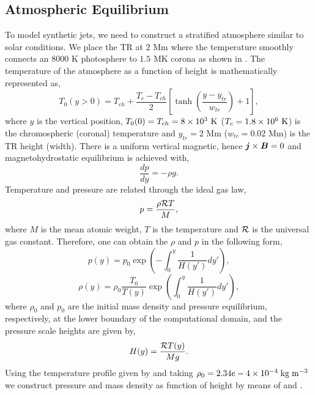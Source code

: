 \subsection{Atmospheric Equilibrium}
\label{sec:atmos_equil}
To model synthetic jets, we need to construct a stratified atmosphere similar to solar conditions. We place the TR at $2$ Mm where the temperature smoothly connects an $8000$ K photosphere to $1.5$ MK corona as shown in . The temperature of the atmosphere as a function of height is mathematically represented as,   
\begin{equation}\label{te_pro}
T_0(y>0) = T_{ch}+\frac{T_{c} - T_{ch}}{2} \left[ \tanh \left( \frac{y-y_{tr}}{w_{tr}} \right)+1 \right],
\end{equation}
where $y$ is the vertical position, $T_0(0)=T_{ch}=8\times10^3 \ \rm{K}$ ($T_{c}=1.8\times10^6 \ \rm{K}$) is the chromospheric (coronal) temperature and $y_{tr}=2$ Mm ($w_{tr}=0.02$ Mm) is the TR height (width). There is a uniform vertical magnetic, hence $\boldsymbol{j} \times \boldsymbol{B}=0$ and magnetohydrostatic equilibrium is achieved with,
\begin{equation}
\frac{dp}{dy} = - \rho g.
\end{equation}
Temperature and pressure are related through the ideal gas law,
\begin{equation}
p = \frac{ \rho \mathcal{R} T}{M},
\end{equation} 
where $M$ is the mean atomic weight, $T$ is the temperature and $\mathcal{R}$ is the universal gas constant. Therefore, one can obtain the $\rho$ and $p$ in the following form,  
\begin{equation}\label{p_pro}
p(y) = p_0 \exp \left( - \int_0^y  \frac{1}{H(y')} dy' \right), 
\end{equation} 
\begin{equation}\label{rho_pro}
\rho(y) = \rho_0 \frac{T_0}{T(y)} \exp \left( \int_0^y \frac{1}{H(y') }dy' \right),
\end{equation}
where $\rho_0$ and $p_0$ are the initial mass density and pressure equilibrium, respectively, at the lower boundary of the computational domain, and the pressure scale heights are given by,
\begin{equation}
H(y) = \frac{\mathcal{R} T(y)}{Mg}.
\end{equation}
Using the temperature profile given by  and taking $\rho_0 = 2.34e-4\times10^{-4}\;\rm{kg}\;\rm{m^{-3}}$ we construct pressure and mass density as function of height by means of  and .
